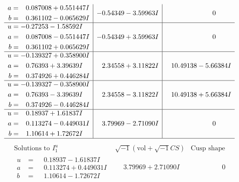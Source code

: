 \documentclass[1p]{elsarticle_modified}
\theoremstyle{definition}
\newcommand{\I}{\sqrt{-1}}
\begin{document}
$$\begin{array}{c|c|c}
\begin{aligned}
a &= \phantom{-}0.087008 + 0.551447 I \\
b &= \phantom{-}0.361102 - 0.065629 I\end{aligned}
 & -0.54349 - 3.59963 I & \phantom{-0.000000 } 0 \\ \hline\begin{aligned}
u &= -0.27253 - 1.58592 I \\
a &= \phantom{-}0.087008 - 0.551447 I \\
b &= \phantom{-}0.361102 + 0.065629 I\end{aligned}
 & -0.54349 + 3.59963 I & \phantom{-0.000000 } 0 \\ \hline\begin{aligned}
u &= -0.139327 + 0.358900 I \\
a &= \phantom{-}0.76393 + 3.39639 I \\
b &= \phantom{-}0.374926 + 0.446284 I\end{aligned}
 & \phantom{-}2.34558 + 3.11822 I & \phantom{-}10.49138 - 5.66384 I \\ \hline\begin{aligned}
u &= -0.139327 - 0.358900 I \\
a &= \phantom{-}0.76393 - 3.39639 I \\
b &= \phantom{-}0.374926 - 0.446284 I\end{aligned}
 & \phantom{-}2.34558 - 3.11822 I & \phantom{-}10.49138 + 5.66384 I \\ \hline\begin{aligned}
u &= \phantom{-}0.18937 + 1.61837 I \\
a &= \phantom{-}0.113274 - 0.449031 I \\
b &= \phantom{-}1.10614 + 1.72672 I\end{aligned}
 & \phantom{-}3.79969 - 2.71090 I & \phantom{-0.000000 } 0\\
 \hline 
 \end{array}$$\newpage$$\begin{array}{c|c|c}  
\text{Solutions to }I^u_{1}& \I (\text{vol} + \sqrt{-1}CS) & \text{Cusp shape}\\
 \hline 
\begin{aligned}
u &= \phantom{-}0.18937 - 1.61837 I \\
a &= \phantom{-}0.113274 + 0.449031 I \\
b &= \phantom{-}1.10614 - 1.72672 I\end{aligned}
 & \phantom{-}3.79969 + 2.71090 I & \phantom{-0.000000 } 0 \\ \hline\begin{aligned}

\end{aligned}
\end{array}$$
\end{document}
